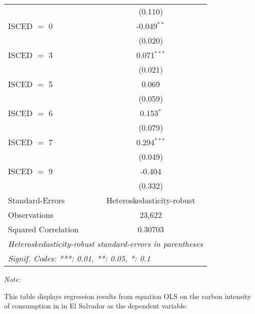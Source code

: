 \begin{table}[htbp!]
\begin{adjustbox}{width = 1\textwidth, max height = 0.95\textheight, center}
\begin{threeparttable}[b]
\begin{tabular}{lc}
                                & (0.110)\\   
            ISCED $=$ 0         & -0.049$^{**}$\\   
                                & (0.020)\\   
            ISCED $=$ 3         & 0.071$^{***}$\\   
                                & (0.021)\\   
            ISCED $=$ 5         & 0.069\\   
                                & (0.059)\\   
            ISCED $=$ 6         & 0.153$^{*}$\\   
                                & (0.079)\\   
            ISCED $=$ 7         & 0.294$^{***}$\\   
                                & (0.049)\\   
            ISCED $=$ 9         & -0.404\\   
                                & (0.332)\\   
            \midrule 
            Standard-Errors     & Heteroskedasticity-robust \\   
            Observations        & 23,622\\  
            Squared Correlation & 0.30703\\  
            \midrule \midrule
            \multicolumn{2}{l}{\emph{Heteroskedasticity-robust standard-errors in parentheses}}\\
            \multicolumn{2}{l}{\emph{Signif. Codes: ***: 0.01, **: 0.05, *: 0.1}}\\
         \end{tabular}
         
         \begin{tablenotes}\item \medskip \textit{Note:}
            \item This table displays regression results from equation OLS on the carbon intensity of consumption in  in El Salvador as the dependent variable. 
         \end{tablenotes}
      \end{threeparttable}
   \end{adjustbox}
\end{table}


